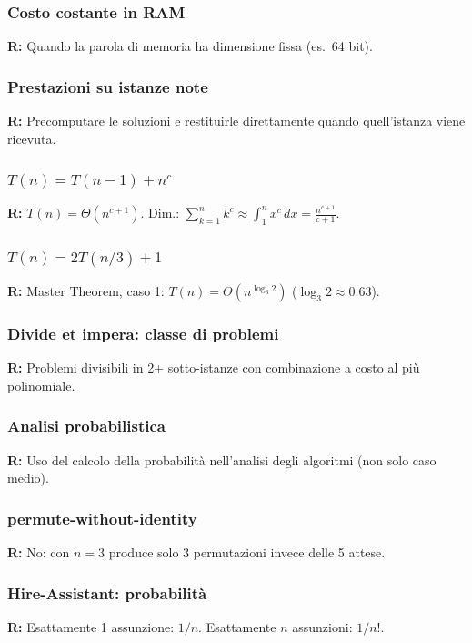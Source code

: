 \subsubsection*{Costo costante in RAM}
\textbf{R:} Quando la parola di memoria ha dimensione fissa (es.\ 64 bit).

\subsubsection*{Prestazioni su istanze note}
\textbf{R:} Precomputare le soluzioni e restituirle direttamente
quando quell'istanza viene ricevuta.

\subsubsection*{\texorpdfstring{$T(n)=T(n-1)+n^c$}{T(n)=T(n-1)+nc}}
\textbf{R:} $T(n) = \Theta(n^{c+1})$.
Dim.: $\sum_{k=1}^n k^c \approx \int_1^n x^c\,dx = \frac{n^{c+1}}{c+1}$.

\subsubsection*{\texorpdfstring{$T(n)=2T(n/3)+1$}{T(n)=2T(n/3)+1}}
\textbf{R:} Master Theorem, caso 1: $T(n) = \Theta(n^{\log_3 2})$
($\log_3 2 \approx 0.63$).

\subsubsection*{Divide et impera: classe di problemi}
\textbf{R:} Problemi divisibili in 2+ sotto-istanze con combinazione
a costo al più polinomiale.

\subsubsection*{Analisi probabilistica}
\textbf{R:} Uso del calcolo della probabilità nell'analisi degli algoritmi
(non solo caso medio).

\subsubsection*{permute-without-identity}
\textbf{R:} No: con $n=3$ produce solo 3 permutazioni invece delle 5 attese.

\subsubsection*{Hire-Assistant: probabilità}
\textbf{R:} Esattamente 1 assunzione: $1/n$. Esattamente $n$ assunzioni:
$1/n!$.

